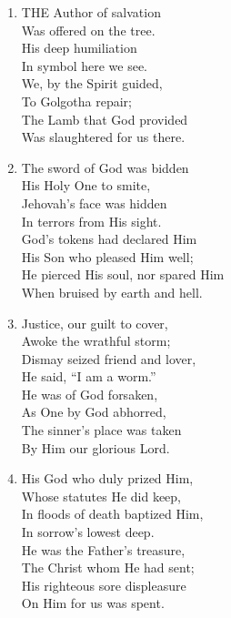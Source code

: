 \begin{enumerate}
    \item THE Author of salvation \\
        Was offered on the tree. \\
        His deep humiliation \\
        In symbol here we see. \\
        We, by the Spirit guided, \\
        To Golgotha repair; \\
        The Lamb that God provided \\
        Was slaughtered for us there.

    \item The sword of God was bidden \\
        His Holy One to smite, \\
        Jehovah's face was hidden \\
        In terrors from His sight. \\
        God's tokens had declared Him \\
        His Son who pleased Him well; \\
        He pierced His soul, nor spared Him \\
        When bruised by earth and hell.

    \item Justice, our guilt to cover, \\
        Awoke the wrathful storm; \\
        Dismay seized friend and lover, \\
        He said, ``I am a worm.'' \\
        He was of God forsaken, \\
        As One by God abhorred, \\
        The sinner's place was taken \\
        By Him our glorious Lord.

    \item His God who duly prized Him, \\
        Whose statutes He did keep, \\
        In floods of death baptized Him, \\
        In sorrow's lowest deep. \\
        He was the Father's treasure, \\
        The Christ whom He had sent; \\
        His righteous sore displeasure \\
        On Him for us was spent.


\end{enumerate}
